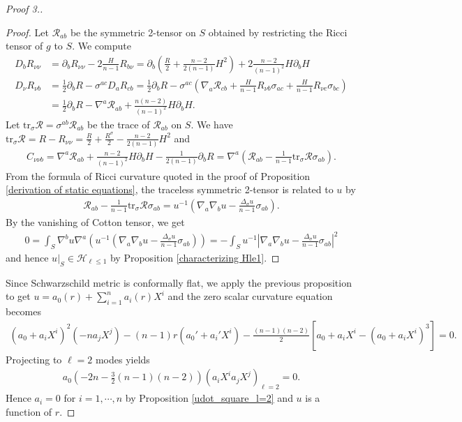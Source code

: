 \documentclass[12pt,twoside]{article}
\theoremstyle{plain}
\theoremstyle{definition}
\theoremstyle{remark}
\newcommand{\pl}{\partial}
\newcommand{\na}{\nabla}
\newcommand{\lt}{\left}
\newcommand{\rt}{\right}
\newcommand{\tr}{\mbox{tr}}
\numberwithin{equation}{section}
\begin{document}
\begin{proof}[Proof 3.]
\begin{proof}
Let $\mathcal{R}_{ab}$ be the symmetric 2-tensor on $S$ obtained by restricting the Ricci tensor of $g$ to $S$. We compute
\begin{align*}
D_b R_{\nu\nu} &= \pl_b R_{\nu\nu} - 2 \frac{H}{n-1} R_{b\nu} = \pl_b \lt( \frac{R}{2} + \frac{n-2}{2(n-1)} H^2 \rt) + 2 \frac{n-2}{(n-1)^2} H \pl_b H \\
D_\nu R_{\nu b} &= \frac{1}{2} \pl_b R - \sigma^{ac} D_a R_{cb} = \frac{1}{2} \pl_b R - \sigma^{ac}\lt( \na_a \mathcal{R}_{cb} + \frac{H}{n-1} R_{\nu b} \sigma_{ac} + \frac{H}{n-1} R_{\nu c} \sigma_{bc} \rt) \\
&= \frac{1}{2} \pl_b R - \na^a \mathcal{R}_{ab} + \frac{n (n-2)}{(n-1)^2} H \pl_b H. 
\end{align*}
Let $\tr_\sigma \mathcal{R} = \sigma^{ab} \mathcal{R}_{ab}$ be the trace of $\mathcal{R}_{ab}$ on $S$. We have $\tr_\sigma \mathcal{R} = R - R_{\nu\nu} = \frac{R}{2} + \frac{R^\sigma}{2} - \frac{n-2}{2(n-1)}H^2$ and
\begin{align*}
C_{\nu\nu b} = \na^a \mathcal{R}_{ab} + \frac{n-2}{(n-1)^2} H \pl_b H - \frac{1}{2(n-1)} \pl_b R = \na^a \lt( \mathcal{R}_{ab} - \frac{1}{n-1} \tr_\sigma \mathcal{R} \sigma_{ab} \rt).
\end{align*}
From the formula of Ricci curvature quoted in the proof of Proposition \ref{derivation of static equations}, the traceless symmetric 2-tensor is related to $u$ by
\begin{align*}
\mathcal{R}_{ab} - \frac{1}{n-1} \tr_\sigma \mathcal{R} \sigma_{ab} = u^{-1} \lt( \na_a\na_b u - \frac{\Delta_\sigma u}{n-1} \sigma_{ab} \rt).
\end{align*}
By the vanishing of Cotton tensor, we get
\begin{align*}
0 = \int_S \na^b u \na^a \lt( u^{-1} (\na_a\na_b u - \frac{\Delta_\sigma u}{n-1}\sigma_{ab}) \rt) = - \int_S u^{-1} \lt| \na_a\na_b u - \frac{\Delta_\sigma u}{n-1} \sigma_{ab} \rt|^2
\end{align*}
and hence $u|_S \in \mathcal{H}_{\ell\le 1}$ by Proposition \ref{characterizing Hle1}.   
\end{proof}
Since Schwarzschild metric is conformally flat, we apply the previous proposition to get $u = a_0(r) + \sum_{i=1}^n a_i(r) X^i$ and the zero scalar curvature equation becomes
\begin{align*}
(a_0 + a_i X^i)^2 (-n a_j X^j) - (n-1) r (a_0' + a_i' X^i) - \frac{(n-1)(n-2)}{2} \lt[ a_0 + a_i X^i - (a_0 + a_i X^i)^3 \rt]=0.
\end{align*}
Projecting to $\ell=2$ modes yields
\begin{align*}
a_0 \lt( -2n - \frac{3}{2}(n-1)(n-2) \rt) (a_i X^i a_j X^j)_{\ell=2} =0.
\end{align*}
Hence $a_i =0$ for $i=1, \cdots, n$ by Proposition \ref{udot_square_l=2} and $u$ is a function of $r$.
\end{proof}
\end{document}
